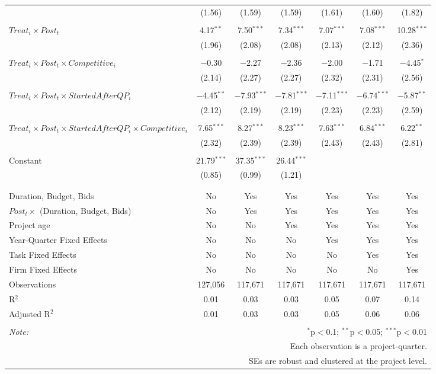 \documentclass[
]{article}
\begin{document}
\begin{table}[H]
\begin{tabular}{@{\extracolsep{-3pt}}lcccccc}
  & (1.56) & (1.59) & (1.59) & (1.61) & (1.60) & (1.82) \\ 
  & & & & & & \\ 
 $Treat_i \times Post_t$ & 4.17$^{**}$ & 7.50$^{***}$ & 7.34$^{***}$ & 7.07$^{***}$ & 7.08$^{***}$ & 10.28$^{***}$ \\ 
  & (1.96) & (2.08) & (2.08) & (2.13) & (2.12) & (2.36) \\ 
  & & & & & & \\ 
 $Treat_i \times Post_t \times Competitive_i$ & $-$0.30 & $-$2.27 & $-$2.36 & $-$2.00 & $-$1.71 & $-$4.45$^{*}$ \\ 
  & (2.14) & (2.27) & (2.27) & (2.32) & (2.31) & (2.56) \\ 
  & & & & & & \\ 
 $Treat_i \times Post_t \times StartedAfterQP_i$ & $-$4.45$^{**}$ & $-$7.93$^{***}$ & $-$7.81$^{***}$ & $-$7.11$^{***}$ & $-$6.74$^{***}$ & $-$5.87$^{**}$ \\ 
  & (2.12) & (2.19) & (2.19) & (2.23) & (2.23) & (2.59) \\ 
  & & & & & & \\ 
 $Treat_i \times Post_t \times StartedAfterQP_i \times Competitive_i$ & 7.65$^{***}$ & 8.27$^{***}$ & 8.23$^{***}$ & 7.63$^{***}$ & 6.84$^{***}$ & 6.22$^{**}$ \\ 
  & (2.32) & (2.39) & (2.39) & (2.43) & (2.43) & (2.81) \\ 
  & & & & & & \\ 
 Constant & 21.79$^{***}$ & 37.35$^{***}$ & 26.44$^{***}$ &  &  &  \\ 
  & (0.85) & (0.99) & (1.21) &  &  &  \\ 
  & & & & & & \\ 
\hline \\[-1.8ex] 
Duration, Budget, Bids & No & Yes & Yes & Yes & Yes & Yes \\ 
$Post_t \times $  (Duration, Budget, Bids) & No & Yes & Yes & Yes & Yes & Yes \\ 
Project age & No & No & Yes & Yes & Yes & Yes \\ 
Year-Quarter Fixed Effects & No & No & No & Yes & Yes & Yes \\ 
Task Fixed Effects & No & No & No & No & Yes & Yes \\ 
Firm Fixed Effects & No & No & No & No & No & Yes \\ 
Observations & 127,056 & 117,671 & 117,671 & 117,671 & 117,671 & 117,671 \\ 
R$^{2}$ & 0.01 & 0.03 & 0.03 & 0.05 & 0.07 & 0.14 \\ 
Adjusted R$^{2}$ & 0.01 & 0.03 & 0.03 & 0.05 & 0.06 & 0.06 \\ 
\hline 
\hline \\[-1.8ex] 
\textit{Note:}  & \multicolumn{6}{r}{$^{*}$p$<$0.1; $^{**}$p$<$0.05; $^{***}$p$<$0.01} \\ 
 & \multicolumn{6}{r}{Each observation is a project-quarter.} \\ 
 & \multicolumn{6}{r}{SEs are robust and clustered at the project level.} \\ 
\end{tabular} 
\end{table}
\end{document}
